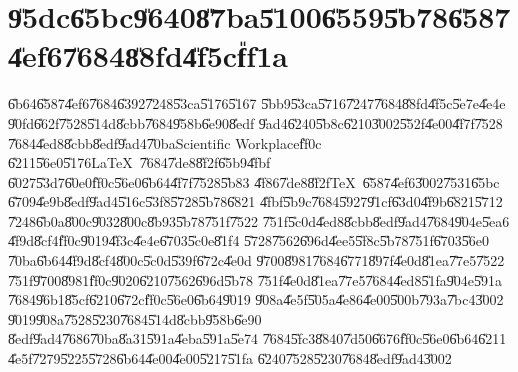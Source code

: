                       

\part{\U{95dc}\U{65bc}\U{9640}\U{87ba}\U{5100}\U{6559}\U{5b78}\U{6587}%
\U{4ef6}\U{7684}\U{88fd}\U{4f5c}\U{ff1a}}

\U{6b64}\U{6587}\U{4ef6}\U{7684}\U{6392}\U{7248}\U{53ca}\U{5176}\U{5167}%
\U{5bb9}\U{53ca}\U{5716}\U{7247}\U{7684}\U{88fd}\U{4f5c}\U{5e7e}\U{4e4e}%
\U{90fd}\U{662f}\U{7528}\U{514d}\U{8cbb}\U{7684}\U{958b}\U{6e90}\U{8edf}%
\U{9ad4}\U{6240}\U{5b8c}\U{6210}\U{3002}\U{552f}\U{4e00}\U{4f7f}\U{7528}%
\U{7684}\U{4ed8}\U{8cbb}\U{8edf}\U{9ad4}\U{70ba}Scientific Workplace\U{ff0c}%
\U{6211}\U{56e0}\U{5176}\LaTeX\ \U{7684}\U{7de8}\U{8f2f}\U{65b9}\U{4fbf}%
\U{6027}\U{53d7}\U{60e0}\U{ff0c}\U{56e0}\U{6b64}\U{4f7f}\U{7528}\U{5b83}%
\U{4f86}\U{7de8}\U{8f2f}\TeX\ \U{6587}\U{4ef6}\U{3002}\U{7531}\U{65bc}%
\U{6709}\U{4e9b}\U{8edf}\U{9ad4}\U{516c}\U{53f8}\U{5728}\U{5b78}\U{6821}%
\U{4fbf}\U{5b9c}\U{7684}\U{5927}\U{91cf}\U{63d0}\U{4f9b}\U{6821}\U{5712}%
\U{7248}\U{6b0a}\U{800c}\U{9032}\U{800c}\U{8b93}\U{5b78}\U{751f}\U{7522}%
\U{751f}\U{5c0d}\U{4ed8}\U{8cbb}\U{8edf}\U{9ad4}\U{7684}\U{904e}\U{5ea6}%
\U{4f9d}\U{8cf4}\U{ff0c}\U{9019}\U{4f3c}\U{4e4e}\U{6703}\U{5c0e}\U{81f4}%
\U{5728}\U{7562}\U{696d}\U{4ee5}\U{5f8c}\U{5b78}\U{751f}\U{6703}\U{56e0}%
\U{70ba}\U{6b64}\U{4f9d}\U{8cf4}\U{800c}\U{5c0d}\U{539f}\U{672c}\U{4e0d}%
\U{9700}\U{8981}\U{7684}\U{6771}\U{897f}\U{4e0d}\U{81ea}\U{77e5}\U{7522}%
\U{751f}\U{9700}\U{8981}\U{ff0c}\U{9020}\U{6210}\U{7562}\U{696d}\U{5b78}%
\U{751f}\U{4e0d}\U{81ea}\U{77e5}\U{7684}\U{4ed8}\U{51fa}\U{904e}\U{591a}%
\U{7684}\U{96b1}\U{85cf}\U{6210}\U{672c}\U{ff0c}\U{56e0}\U{6b64}\U{9019}%
\U{908a}\U{4e5f}\U{505a}\U{4e86}\U{4e00}\U{500b}\U{793a}\U{7bc4}\U{3002}%
\U{9019}\U{908a}\U{7528}\U{5230}\U{7684}\U{514d}\U{8cbb}\U{958b}\U{6e90}%
\U{8edf}\U{9ad4}\U{7686}\U{70ba}\U{8a31}\U{591a}\U{4eba}\U{591a}\U{5e74}%
\U{7684}\U{5fc3}\U{8840}\U{7d50}\U{6676}\U{ff0c}\U{56e0}\U{6b64}\U{6211}%
\U{4e5f}\U{7279}\U{5225}\U{5728}\U{6b64}\U{4e00}\U{4e00}\U{5217}\U{51fa}%
\U{6240}\U{7528}\U{5230}\U{7684}\U{8edf}\U{9ad4}\U{3002}

